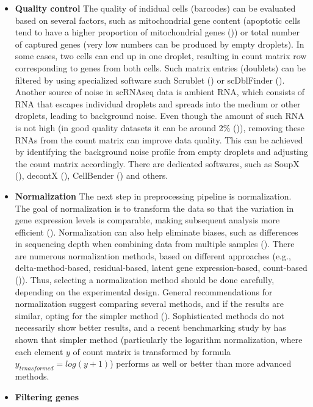 \begin{itemize}
  \item \textbf{Quality control}
The quality of indidual cells (barcodes) can be evaluated based on several factors, such as mitochondrial gene content
(apoptotic cells tend to have a higher proportion of mitochondrial genes (\cite{Heumos2023})) or
total number of captured genes (very low numbers can be produced by empty droplets).
In some cases, two cells can end up in one droplet,
resulting in count matrix row corresponding to genes from  both cells.
Such matrix entries (doublets) can be filtered by using specialized software
such Scrublet (\cite{Wolock2019}) or scDblFinder (\cite{Germain2022}).
Another source of noise in scRNAseq data is ambient RNA,
which consists of RNA that escapes individual droplets and spreads into the medium or other droplets,
leading to background noise.
Even though the amount of such RNA is not high (in good quality datasets it can be around 2\% (\cite{Young2020})),
removing these RNAs from the count matrix can improve data quality.
This can be achieved by identifying the background noise profile from empty droplets and
adjusting the count matrix accordingly.
There are dedicated softwares,
such as SoupX (\cite{Young2020}), decontX (\cite{Yang2020}), CellBender (\cite{Fleming2023}) and others.
  \item \textbf{Normalization}
The next step in preprocessing pipeline is normalization.
The goal of normalization is to transform the data so that the variation in gene expression levels is comparable,
making subsequent analysis more efficient (\cite{Ahlmann2023}).
Normalization can also help eliminate biases,
such as differences in sequencing depth when combining data from multiple samples (\cite{Lingen2024}).
There are numerous normalization methods, based on different approaches
(e.g., delta-method-based, residual-based, latent gene expression-based, count-based (\cite{Ahlmann2023})).
Thus, selecting a normalization method should be done carefully, depending on the experimental design.
General recommendations for normalization suggest comparing several methods,
and if the results are similar, opting for the simpler method (\cite{Lingen2024}).
Sophisticated methods do not necessarily show better results, and a recent benchmarking study by \textcite{Ahlmann2023}
has shown that simpler method (particularly the logarithm normalization,
where each element $y$ of count matrix is transformed by formula $y_{trnasformed} = log(y+1)$)
performs as well or better than more advanced methods.
\item \textbf{Filtering genes}

\end{itemize}
